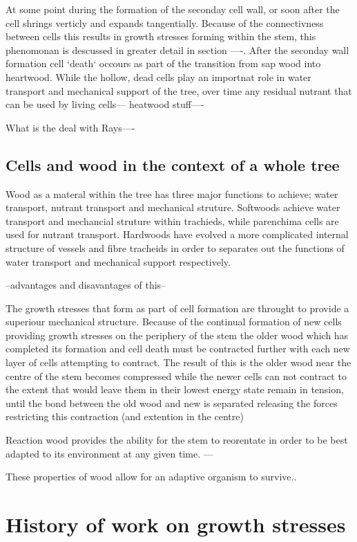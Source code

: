 \documentclass{article}
\begin{document}
At some point during the formation of the seconday cell wall, or soon after the
cell shrings verticly and expands tangentially. Because of the connectivness
between cells this results in growth stresses forming within the stem, this
phenomonan is descussed in greater detail in section ----. After the seconday
wall formation cell `death` occours as part of the transition from sap wood into
heartwood. While the hollow, dead cells play an importnat role in water
transport and mechanical support of the tree, over time any residual nutrant
that can be used by living cells--- heatwood stuff----

What is the deal with Rays----

\subsection{Cells and wood in the context of a whole tree}
Wood as a materal within the tree has three major functions to achieve; water
transport, nutrant transport and mechanical struture. Softwoods achieve
water transport and mechancial struture within trachieds, while parenchima cells
are used for nutrant transport. Hardwoods have evolved a more complicated
internal structure of vessels and fibre tracheids in order to separates out the
functions of water transport and mechanical support respectively.

--advantages and disavantages of this--

The growth stresses that form as part of cell formation are throught to provide
a superiour mechanical structure. Because of the continual formation of new
cells providing growth stresses on the periphery of the stem the older wood
which has completed its formation and cell death must be contracted further with each
new layer of cells attempting to contract. The result of this is the older wood
near the centre of the stem becomes compressed while the newer cells can not
contract to the extent that would leave them in their lowest energy state
remain in tension, until the bond between the old wood and new is separated
releasing the forces restricting this contraction (and extention in the centre)

Reaction wood provides the ability for the stem to reorentate
in order to be best adapted to its environment at any given time. ---

These properties of wood allow for an adaptive organism to survive..

\section{History of work on growth stresses}
\end{document}
